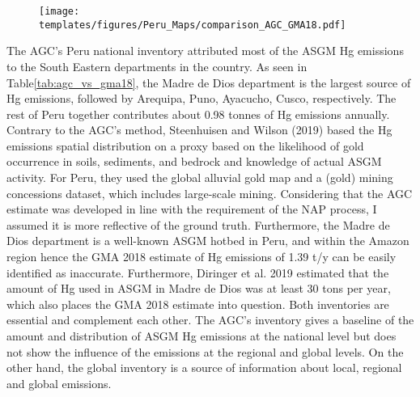\begin{figure}[H]
\centering
  \texttt{[image: templates/figures/Peru\_Maps/comparison\_AGC\_GMA18.pdf]}  

\label{fig:agc_vs_gma18}
\end{figure}
\FloatBarrier
\begin{flushleft}
The AGC's Peru national inventory attributed most of the ASGM Hg emissions to the South Eastern departments in the country\cite{agc_reporte_2017}. As seen in Table\ref{tab:agc_vs_gma18}, the Madre de Dios department is the largest source of Hg emissions, followed by Arequipa, Puno, Ayacucho, Cusco, respectively. The rest of Peru together contributes about 0.98 tonnes of Hg emissions annually. Contrary to the AGC's method, Steenhuisen and Wilson (2019) based the Hg emissions spatial distribution on a proxy based on the likelihood of gold occurrence in soils, sediments, and bedrock and knowledge of actual ASGM activity. For Peru, they used the global alluvial gold map and a (gold) mining concessions dataset, which includes large-scale mining. Considering that the AGC estimate was developed in line with the requirement of the NAP process, I assumed it is more reflective of the ground truth. Furthermore, the Madre de Dios department is a well-known ASGM hotbed in Peru, and within the Amazon region hence the GMA 2018 estimate of Hg emissions of 1.39 t/y can be easily identified as inaccurate. Furthermore, Diringer et al. 2019 estimated that the amount of Hg used in ASGM in Madre de Dios was at least 30 tons per year, which also places the GMA 2018 estimate into question\cite{diringer_deforestation_2019}. Both inventories are essential and complement each other. The AGC's inventory gives a baseline of the amount and distribution of ASGM Hg emissions at the national level but does not show the influence of the emissions at the regional and global levels. On the other hand, the global inventory is a source of information about local, regional and global emissions. 
\end{flushleft}
